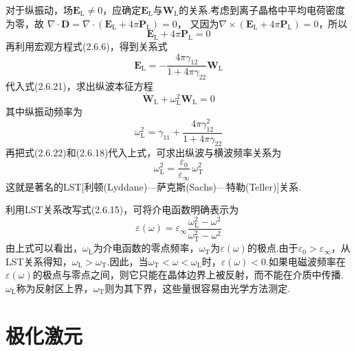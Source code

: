 对于纵振动，场$\boldsymbol{E}_{\mathrm{L}}\neq0$，应确定$\boldsymbol{E}_{\mathrm{L}}$与$\boldsymbol{W}_{\mathrm{L}}$的关系.考虑到离子晶格中平均电荷密度为零，故
$\nabla\cdot\boldsymbol{D}=\nabla\cdot(\boldsymbol{E}_{\mathrm{L}}+4\pi\boldsymbol{P}_{\mathrm{L}})=0$，
又因为$\nabla\times(\boldsymbol{E}_{\mathrm{L}}+4\pi\boldsymbol{P}_{\mathrm{L}})=0$，所以
\begin{equation}
  \boldsymbol{E}_{\mathrm{L}}+4\pi\boldsymbol{P}_{\mathrm{L}}=0
\end{equation}
再利用宏观方程式(2.6.6)，得到关系式
\begin{equation}
  \boldsymbol{E}_{\mathrm{L}}
  =-\frac{4\pi\gamma_{12}}{1+4\pi\gamma_{22}}\boldsymbol{W}_{\mathrm{L}}
\end{equation}
代入式(2.6.21)，求出纵波本征方程
\begin{equation}
  \ddot{\boldsymbol{W}}_{\mathrm{L}}+\omega_{\mathrm{L}}^2\boldsymbol{W}_{\mathrm{L}}=0
\end{equation}
其中纵振动频率为
\begin{equation}
  \omega_{\mathrm{L}}^2=\gamma_{11}+\frac{4\pi\gamma_{12}^2}{1+4\pi\gamma_{22}}
\end{equation}
再把式(2.6.22)和(2.6.18)代入上式，可求出纵波与横波频率关系为
\begin{equation}
  \omega_{\mathrm{L}}^2=\frac{\varepsilon_0}{\varepsilon_{\infty}}\,\omega_{\mathrm{T}}^2
\end{equation}
这就是著名的LST[利顿(Lyddane)—萨克斯(Sachs)—特勒(Teller)]关系.

利用LST关系改写式(2.6.15)，可将介电函数明确表示为
\begin{equation}
  \varepsilon(\omega)=\varepsilon_{\infty}
  \frac{\omega_{\mathrm{L}}^2-\omega^2}{\omega_{\mathrm{T}}^2-\omega^2}
\end{equation}
由上式可以看出，$\omega_{\mathrm{L}}$为介电函数的零点频率，$\omega_{\mathrm{T}}$为$\varepsilon(\omega)$的极点.由于$\varepsilon_0>\varepsilon_{\infty}$，从LST关系得知，$\omega_{\mathrm{L}}>\omega_{\mathrm{T}}$.因此，当$\omega_{\mathrm{T}}<\omega<\omega_{\mathrm{L}}$时，$\varepsilon(\omega)<0$.如果电磁波频率在$\varepsilon(\omega)$的极点与零点之间，则它只能在晶体边界上被反射，而不能在介质中传播.$\omega_{\mathrm{L}}$称为反射区上界，$\omega_{\mathrm{T}}$则为其下界，这些量很容易由光学方法测定.

\section{极化激元}

